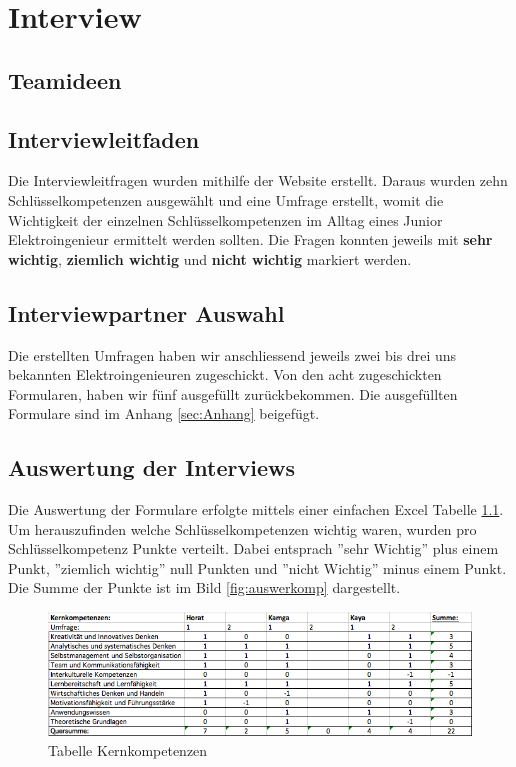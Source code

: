 
\chapter{Interview}

\section{Teamideen}

\section{Interviewleitfaden}

Die Interviewleitfragen wurden mithilfe der Website \cite{Schluesselqualifikationen} erstellt. Daraus wurden zehn Schlüsselkompetenzen ausgewählt und eine Umfrage erstellt, womit die Wichtigkeit der einzelnen Schlüsselkompetenzen im Alltag eines Junior Elektroingenieur ermittelt werden sollten. Die Fragen konnten jeweils mit \textbf{sehr wichtig}, \textbf{ziemlich wichtig} und \textbf{nicht wichtig} markiert werden.   


\section{Interviewpartner Auswahl}

Die erstellten Umfragen haben wir anschliessend jeweils zwei bis drei uns bekannten Elektroingenieuren zugeschickt. Von den acht zugeschickten Formularen, haben wir fünf ausgefüllt zurückbekommen.
Die ausgefüllten Formulare sind im Anhang \ref{sec:Anhang} beigefügt. 

\section{Auswertung der Interviews}

Die Auswertung der Formulare erfolgte mittels einer einfachen Excel Tabelle \ref{fig:tabkernkomp}. Um herauszufinden welche Schlüsselkompetenzen wichtig waren, wurden pro Schlüsselkompetenz Punkte verteilt. Dabei entsprach ''sehr Wichtig'' plus einem Punkt, ''ziemlich wichtig'' null Punkten und ''nicht Wichtig'' minus einem Punkt. Die Summe der Punkte ist im Bild \ref{fig:auswerkomp} dargestellt. 

\begin{figure}[ht]
	\centering
	\includegraphics[width=1.1\textwidth]{images/Tabelle_Kernkompetenzen.png}
	\caption{Tabelle Kernkompetenzen}
	\label{fig:tabkernkomp}
\end{figure}

